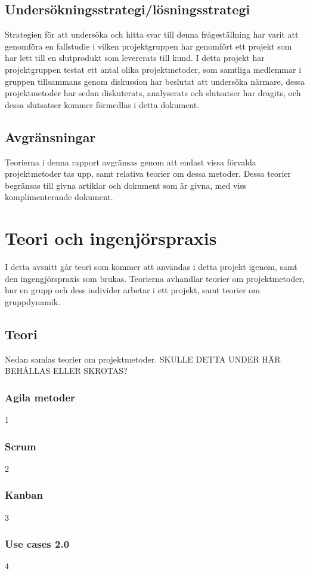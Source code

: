 \documentclass[conference]{IEEEtran}
\begin{document}
\subsection{Undersökningsstrategi/lösningsstrategi}
Strategien för att undersöka och hitta svar till denna frågeställning har varit att genomföra en fallstudie i vilken projektgruppen har genomfört ett projekt som har lett till en slutprodukt som levererats till kund. I detta projekt har projektgruppen testat ett antal olika projektmetoder, som samtliga medlemmar i gruppen tillsammans genom diskussion har beslutat att undersöka närmare, dessa projektmetoder har sedan diskuterats, analyserats och slutsatser har dragits, och dessa slutsatser kommer förmedlas i detta dokument.

\subsection{Avgränsningar}
Teorierna i denna rapport avgränsas genom att endast vissa förvalda projektmetoder tas upp, samt relativa teorier om dessa metoder. Dessa teorier begränsas till givna artiklar och dokument som är givna, med viss komplimenterande dokument.

\section{Teori och ingenjörspraxis}
I detta avsnitt går teori som kommer att användas i detta projekt igenom, samt den ingengjörspraxis som brukas. Teorierna avhandlar teorier om projektmetoder, hur en grupp och dess individer arbetar i ett projekt, samt teorier om gruppdynamik.

\subsection{Teori}
Nedan samlas teorier om projektmetoder. SKULLE DETTA UNDER HÄR BEHÅLLAS ELLER SKROTAS?\\
\subsubsection{Agila metoder}
1
\subsubsection{Scrum}
2
\subsubsection{Kanban}
3
\subsubsection{Use cases 2.0}
4
\end{document}
